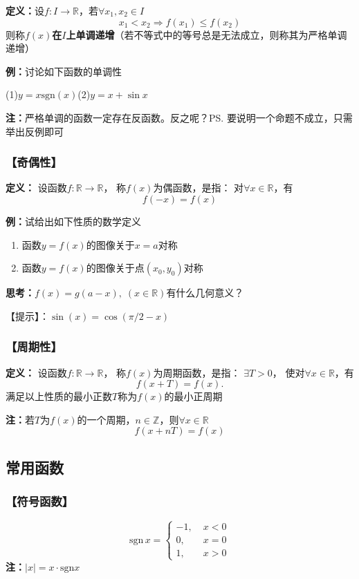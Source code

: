 {{\bf 定义：}}设$f:I\to\mathbb{R}$，若$\forall x_1,x_2\in I$
$$x_1<x_2\Rightarrow f(x_1)\leq f(x_2)$$
则称{\bf $f(x)$在$I$上单调递增}（若不等式中的等号总是无法成立，则称其为严格单调递增）
	
{{\bf 例：}讨论如下函数的单调性}

	\quad(1)\;$y=x\mathrm{sgn}(x)$\hspace{3cm}(2)\;$y=x+\sin x$

{\bf 注：}严格单调的函数一定存在反函数。反之呢？\ps{要说明一个命题不成立，只需举出反例即可}

\subsubsection{【奇偶性】}

{{\bf 定义：}}
	设函数$f:\mathbb{R}\to\mathbb{R}$，
	{\bb 称$f(x)$为偶函数}，是指： 对$\forall x\in\mathbb{R}$，有
	$$f(-x)=f(x)$$

{{\bf 例：}试给出如下性质的数学定义}
	\begin{enumerate}
	  \item 函数$y=f(x)$的图像关于$x=a$对称
	  \item 函数$y=f(x)$的图像关于点$(x_0,y_0)$对称
	\end{enumerate}

{{\bf 思考：}$f(x)=g(a-x),\;(x\in\mathbb{R})$有什么几何意义？}

【提示】：$\sin(x)=\cos(\pi/2-x)$

\subsubsection{【周期性】}

{{\bf 定义：}}
设函数$f:\mathbb{R}\to\mathbb{R}$，
称{\bb $f(x)$为周期函数}，是指： $\exists T>0$，
使对$\forall x\in\mathbb{R}$，有
$$f(x+T)=f(x).$$
 满足以上性质的最小正数$T$称为$f(x)$的{\bb 最小正周期}
		 
{\bf 注：}若$T$为$f(x)$的一个周期，$n\in\mathbb{Z}$，则$\forall x\in\mathbb{R}$
$$f(x+nT)=f(x)$$

\subsection{常用函数}

\subsubsection{\bf 【符号函数】}

  $$\bm{\mathrm{sgn}}\,x =\left\{
	\begin{array}{rl}
	-1,\;&x<0 \\
	0,\;&x=0 \\
	1,\;&x>0
	\end{array}
  \right.$$
  {\bf 注：}$|x|=x \cdot\mathrm{sgn} x$
	

